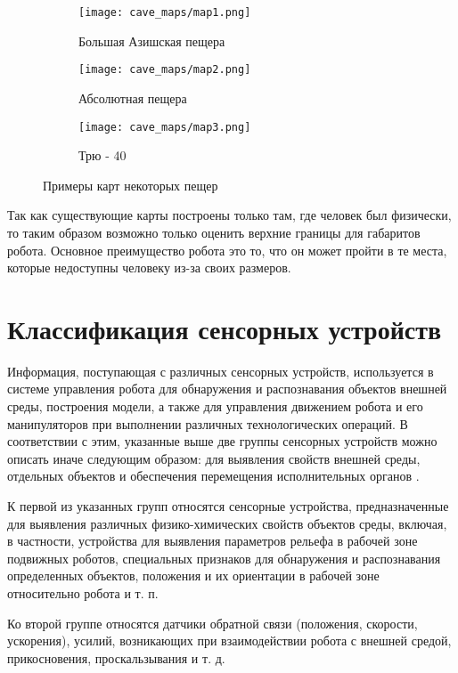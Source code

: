 \begin{figure}[H]
\begin{subfigure}{0.8\textwidth}
\centering\texttt{[image: cave\_maps/map1.png]}\\
\caption{Большая Азишская пещера}
\label{fig:ice}
\end{subfigure}

\begin{subfigure}{0.8\textwidth}
\centering\texttt{[image: cave\_maps/map2.png]}\\
\caption{Абсолютная пещера}
\end{subfigure}

\begin{subfigure}{0.8\textwidth}
\centering\texttt{[image: cave\_maps/map3.png]}\\
\caption{Трю - 40}
\end{subfigure}
\caption{Примеры карт некоторых пещер}
\end{figure}

Так как существующие карты построены только там, где человек был физически, то таким образом возможно только оценить верхние границы для габаритов робота. Основное преимущество робота это то, что он может пройти в те места, которые недоступны человеку из-за своих размеров.


\section{Классификация сенсорных устройств}
Информация, поступающая с различных сенсорных устройств, используется в системе управления робота для обнаружения и распознавания объектов внешней среды, построения модели, а также для управления движением робота и его манипуляторов при выполнении различных технологических операций. В соответствии с этим, указанные выше две группы сенсорных устройств можно описать иначе следующим образом: для выявления свойств внешней среды, отдельных объектов и обеспечения перемещения исполнительных органов \cite{2013,1984,2015}.

К первой из указанных групп относятся сенсорные устройства, предназначенные для выявления различных физико-химических свойств объектов среды, включая, в частности, устройства для выявления параметров рельефа в рабочей зоне подвижных роботов, специальных признаков для обнаружения и распознавания определенных объектов, положения и их ориентации в рабочей зоне относительно робота и т. п.

Ко второй группе относятся датчики обратной связи (положения, скорости, ускорения), усилий, возникающих при взаимодействии робота с внешней средой, прикосновения, проскальзывания и т. д.

